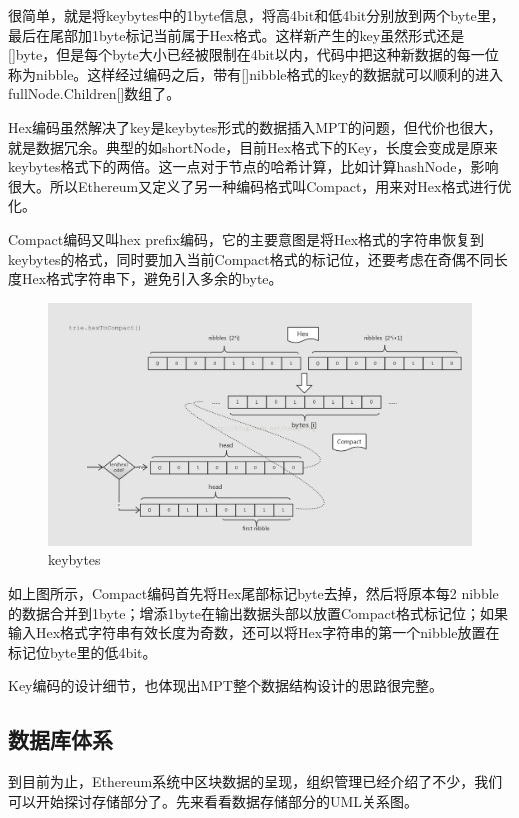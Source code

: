 \documentclass[UTF8]{ctexart}
\begin{document}
很简单，就是将keybytes中的1byte信息，将高4bit和低4bit分别放到两个byte里，最后在尾部加1byte标记当前属于Hex格式。这样新产生的key虽然形式还是[]byte，但是每个byte大小已经被限制在4bit以内，代码中把这种新数据的每一位称为nibble。这样经过编码之后，带有[]nibble格式的key的数据就可以顺利的进入fullNode.Children[]数组了。

Hex编码虽然解决了key是keybytes形式的数据插入MPT的问题，但代价也很大，就是数据冗余。典型的如shortNode，目前Hex格式下的Key，长度会变成是原来keybytes格式下的两倍。这一点对于节点的哈希计算，比如计算hashNode，影响很大。所以Ethereum又定义了另一种编码格式叫Compact，用来对Hex格式进行优化。

Compact编码又叫hex prefix编码，它的主要意图是将Hex格式的字符串恢复到keybytes的格式，同时要加入当前Compact格式的标记位，还要考虑在奇偶不同长度Hex格式字符串下，避免引入多余的byte。

\begin{figure}
	\centering
	\includegraphics[scale=0.35]{keybytes2.png}
	\caption{keybytes}
	\label{keybytes2}
\end{figure}

如上图所示，Compact编码首先将Hex尾部标记byte去掉，然后将原本每2 nibble的数据合并到1byte；增添1byte在输出数据头部以放置Compact格式标记位；如果输入Hex格式字符串有效长度为奇数，还可以将Hex字符串的第一个nibble放置在标记位byte里的低4bit。

Key编码的设计细节，也体现出MPT整个数据结构设计的思路很完整。

\subsection{数据库体系}

到目前为止，Ethereum系统中区块数据的呈现，组织管理已经介绍了不少，我们可以开始探讨存储部分了。先来看看数据存储部分的UML关系图。
\end{document}
